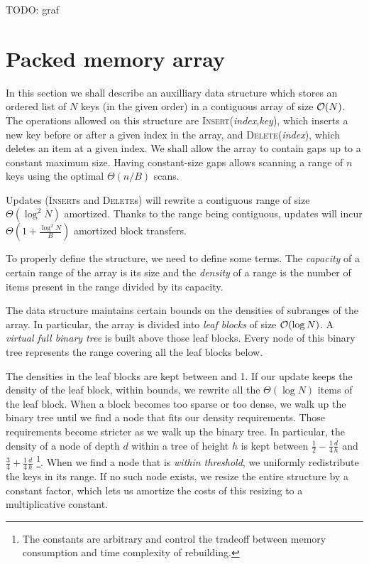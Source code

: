 TODO: graf

\section{Packed memory array}
In this section we shall describe an auxilliary data structure which stores
an ordered list of $N$ keys (in the given order) in a contiguous array of
size $\mathcal{O}(N)$. The operations allowed on this structure are
\textsc{Insert}(\textit{index},\textit{key}), which inserts a new key before
or after a given index in the array, and \textsc{Delete}(\textit{index}),
which deletes an item at a given index.
We shall allow the array to contain gaps up to a constant maximum size.
Having constant-size gaps allows scanning a range of $n$ keys using the
optimal $\Theta(n/B)$ scans.

Updates (\textsc{Insert}s and \textsc{Delete}s) will rewrite a contiguous
range of size $\Theta(\log^2 N)$ amortized. Thanks to the range being
contiguous, updates will incur $\Theta(1+\frac{\log^2 N}{B})$ amortized
block transfers.

To properly define the structure, we need to define some terms. The
\textit{capacity} of a certain range of the array is its size and the
\textit{density} of a range is the number of items present in the range divided
by its capacity.

The data structure maintains certain bounds on the densities of subranges of the array.
In particular, the array is divided into \textit{leaf blocks} of size $\mathcal{O}(\log N)$.
A \textit{virtual full binary tree} is built above those leaf blocks. Every
node of this binary tree represents the range covering all the leaf blocks below.

The densities in the leaf blocks are kept between  %
and 1. If our update keeps the density of the leaf block, within bounds,
we rewrite all the $\Theta(\log N)$ items of the leaf block.
When a block becomes too sparse or too dense, we walk up the binary
tree until we find a node that fits our density requirements.
Those requirements become stricter as we walk up the binary tree.
In particular, the density of a node of depth $d$ within a tree of height $h$
is kept between $\frac{1}{2}-\frac{1}{4}\frac{d}{h}$ and $\frac{3}{4}+\frac{1}{4}\frac{d}{h}$
\footnote{The constants are arbitrary and control the tradeoff
between memory consumption and time complexity of rebuilding.}.
When we find a node that is \textit{within threshold}, we uniformly redistribute
the keys in its range. If no such node exists, we resize the entire structure
by a constant factor, which lets us amortize the costs of this resizing to
a multiplicative constant.

